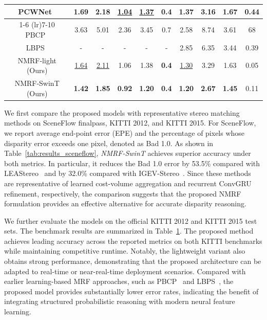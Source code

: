 \begin{table}[!t]
{\begin{tabular}{c c c c c c c c c c}
		PCWNet~\cite{shen2022pcw} & 1.69 & 2.18 & \underline{1.04} & \underline{1.37} & \textbf{0.4} & 1.37 & 3.16 & 1.67 & 0.44\\
		\cmidrule(lr){1-6}
		\cmidrule(lr){7-10}
		PBCP~\cite{seki2016patch} & 3.63 & 5.01 & 2.36 & 3.45 & 0.7 & 2.58 & 8.74 & 3.61 & 68\\
		LBPS~\cite{knobelreiter2020belief} & - & - & - & - & - & 2.85 & 6.35 & 3.44 & 0.39\\ 
		NMRF-light (Ours) & \underline{1.64} & \underline{2.11} & 1.06 & 1.38 & \textbf{0.4} & \underline{1.30} & 3.29 & 1.63 & 0.05\\
		NMRF-SwinT (Ours) & \textbf{1.42} & \textbf{1.85} & \textbf{0.92} & \textbf{1.20} & \textbf{0.4} & \textbf{1.20} & \textbf{2.67} & \textbf{1.45} & 0.11\\
		\bottomrule
	\end{tabular}
	}
	\vspace{-0.5em}
	\label{tab:results_kitti}
\end{table}

We first compare the proposed models with representative stereo matching methods on SceneFlow finalpass, KITTI 2012, and KITTI 2015.
For SceneFlow, we report average end-point error (EPE) and the percentage of pixels whose disparity error exceeds one pixel, denoted as Bad 1.0.
As shown in Table~\ref{tab:results_sceneflow}, \emph{NMRF-SwinT} achieves superior accuracy under both metrics.
In particular, it reduces the Bad 1.0 error by 53.5\% compared with LEAStereo~\cite{cheng2020hierarchical} and by 32.0\% compared with IGEV-Stereo~\cite{xu2023iterative}.
Since these methods are representative of learned cost-volume aggregation and recurrent ConvGRU refinement, respectively, the comparison suggests that the proposed NMRF formulation provides an effective alternative for accurate disparity reasoning.

We further evaluate the models on the official KITTI 2012 and KITTI 2015 test sets.
The benchmark results are summarized in Table~\ref{tab:results_kitti}.
The proposed method achieves leading accuracy across the reported metrics on both KITTI benchmarks while maintaining competitive runtime.
Notably, the lightweight variant also obtains strong performance, demonstrating that the proposed architecture can be adapted to real-time or near-real-time deployment scenarios.
Compared with earlier learning-based MRF approaches, such as PBCP~\cite{seki2016patch} and LBPS~\cite{knobelreiter2020belief}, the proposed model provides substantially lower error rates, indicating the benefit of integrating structured probabilistic reasoning with modern neural feature learning.

